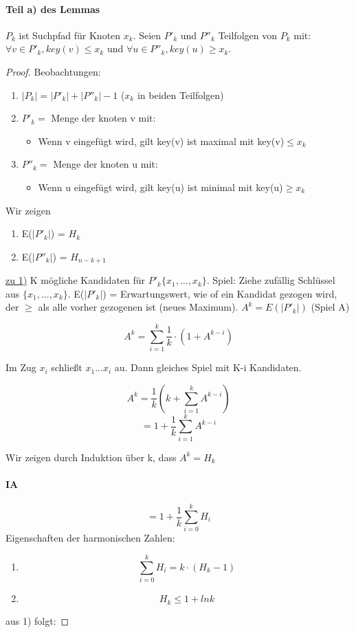 \paragraph{Teil a) des Lemmas} $P_k $ ist Suchpfad für Knoten $x_k $. Seien $ P'_k $ und $ P''_k $ Teilfolgen von $ P_k $ mit: $ \forall v \in P'_k, key(v)\leq x_k $ und $ \forall u \in P''_k, key(u)\geq x_k $. 
\begin{proof}
Beobachtungen:
\begin{enumerate}
    \item $ |P_k| = |P'_k| + |P''_k| - 1 $ ($ x_k $ in beiden Teilfolgen)
    \item $ P'_k = $ Menge der knoten v mit:
    \begin{itemize}
        \item Wenn v eingefügt wird, gilt key(v) ist maximal mit key(v)$ \leq x_k $
    \end{itemize}
    \item $ P''_k = $ Menge der knoten u mit:
    \begin{itemize}
        \item Wenn u eingefügt wird, gilt key(u) ist minimal mit key(u)$ \geq x_k $
    \end{itemize}
\end{enumerate}
Wir zeigen
\begin{enumerate}
    \item E($ |P'_k| $) = $ H_k $
    \item E($ |P''_k| $) = $ H_{n-k+1} $
\end{enumerate}
\underline{zu 1)} K mögliche Kandidaten für $ P'_k \{x_1,...,x_k\}$. Spiel: Ziehe zufällig Schlüssel aus $\{x_1,...,x_k\}$. E($ |P'_k| $) = Erwartungswert, wie of ein Kandidat gezogen wird, der $ \geq $ als alle vorher gezogenen ist (neues Maximum). $ A^k = E(|P'_k|)$ (Spiel A)

$$A^k = \sum_{i=1}^k \frac{1}{k} \cdot (1 + A^{k-i})$$

Im Zug $ x_i $ schließt $ x_1 ... x_i $ au. Dann gleiches Spiel mit K-i Kandidaten.

$$A^k = \frac{1}{k} (k + \sum^{k}_{i=1} A^{k-i}) $$
$$ = 1 + \frac{1}{k} \sum^{k}_{i=1} A^{k-i}$$ 

Wir zeigen durch Induktion über k, dass $ A^k = H_k $

\paragraph{IA}
$$ = 1 + \frac{1}{k} \sum^{k}_{i=0} H_i$$ 
Eigenschaften der harmonischen Zahlen:
\begin{enumerate}
    \item $$ \sum^{k}_{i=0} H_i = k \cdot (H_k -1 )$$
    \item $$ H_k \leq 1 + lnk$$ 
\end{enumerate}
aus 1) folgt: 


\end{proof}
